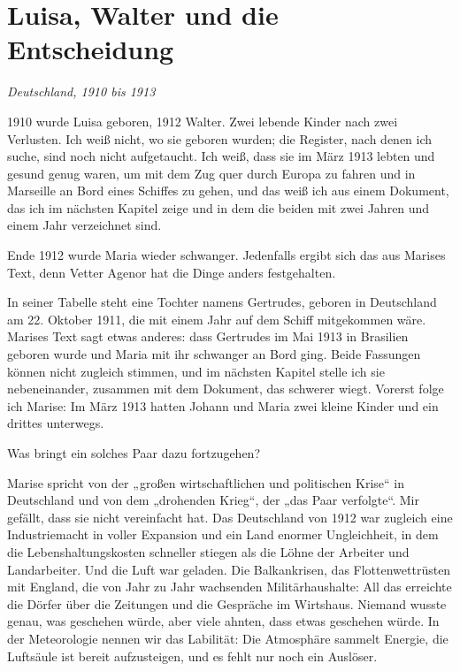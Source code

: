 \documentclass[
  ngerman,
  11pt,
  openany]{book}
\begin{document}
\section{Luisa, Walter und die
Entscheidung}\label{luisa-walter-und-die-entscheidung}

\emph{Deutschland, 1910 bis 1913}

1910 wurde Luisa geboren, 1912 Walter. Zwei lebende Kinder nach zwei
Verlusten. Ich weiß nicht, wo sie geboren wurden; die Register, nach
denen ich suche, sind noch nicht aufgetaucht. Ich weiß, dass sie im März
1913 lebten und gesund genug waren, um mit dem Zug quer durch Europa zu
fahren und in Marseille an Bord eines Schiffes zu gehen, und das weiß
ich aus einem Dokument, das ich im nächsten Kapitel zeige und in dem die
beiden mit zwei Jahren und einem Jahr verzeichnet sind.

Ende 1912 wurde Maria wieder schwanger. Jedenfalls ergibt sich das aus
Marises Text, denn Vetter Agenor hat die Dinge anders festgehalten.

In seiner Tabelle steht eine Tochter namens Gertrudes, geboren in
Deutschland am 22. Oktober 1911, die mit einem Jahr auf dem Schiff
mitgekommen wäre. Marises Text sagt etwas anderes: dass Gertrudes im Mai
1913 in Brasilien geboren wurde und Maria mit ihr schwanger an Bord
ging. Beide Fassungen können nicht zugleich stimmen, und im nächsten
Kapitel stelle ich sie nebeneinander, zusammen mit dem Dokument, das
schwerer wiegt. Vorerst folge ich Marise: Im März 1913 hatten Johann und
Maria zwei kleine Kinder und ein drittes unterwegs.

Was bringt ein solches Paar dazu fortzugehen?

Marise spricht von der „großen wirtschaftlichen und politischen Krise``
in Deutschland und von dem „drohenden Krieg``, der „das Paar
verfolgte``. Mir gefällt, dass sie nicht vereinfacht hat. Das
Deutschland von 1912 war zugleich eine Industriemacht in voller
Expansion und ein Land enormer Ungleichheit, in dem die
Lebenshaltungskosten schneller stiegen als die Löhne der Arbeiter und
Landarbeiter. Und die Luft war geladen. Die Balkankrisen, das
Flottenwettrüsten mit England, die von Jahr zu Jahr wachsenden
Militärhaushalte: All das erreichte die Dörfer über die Zeitungen und
die Gespräche im Wirtshaus. Niemand wusste genau, was geschehen würde,
aber viele ahnten, dass etwas geschehen würde. In der Meteorologie
nennen wir das Labilität: Die Atmosphäre sammelt Energie, die Luftsäule
ist bereit aufzusteigen, und es fehlt nur noch ein Auslöser.
\end{document}
